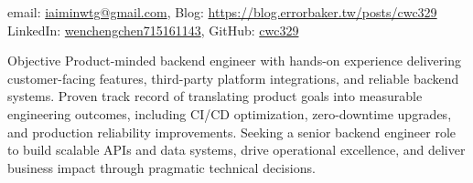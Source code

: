 \documentclass[
	11pt, %
]{resume} %
\begin{document}
%
email: \href{mailto:iaiminwtg@gmail.com}{iaiminwtg@gmail.com}, Blog: \href{https://blog.errorbaker.tw/posts/cwc329}{https://blog.errorbaker.tw/posts/cwc329} \\
LinkedIn: \href{https://www.linkedin.com/in/wenchengchen715161143}{wenchengchen715161143}, GitHub: \href{https://github.com/cwc329}{cwc329}


\begin{rSection}{Objective}
    Product-minded backend engineer with hands-on experience delivering customer-facing features, third-party platform integrations, and reliable backend systems.
    Proven track record of translating product goals into measurable engineering outcomes, including CI/CD optimization, zero-downtime upgrades, and production reliability improvements.
    Seeking a senior backend engineer role to build scalable APIs and data systems, drive operational excellence, and deliver business impact through pragmatic technical decisions.
\end{rSection}
\end{document}
